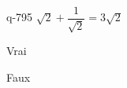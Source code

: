 \begin{truefalse}{q-795}
$\sqrt{2}+\dfrac{1}{\sqrt{2}}=3\sqrt{2}$
\item Vrai
\item* Faux
\end{truefalse}

